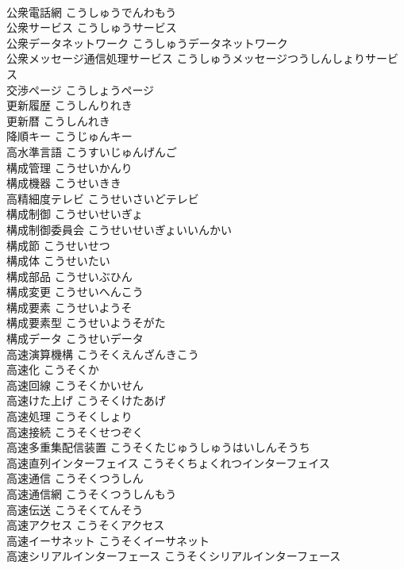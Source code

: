 \documentclass[8pt]{extreport}
\begin{document}
\begin{CJK}{UTF8}{min}
\\	公衆電話網	こうしゅうでんわもう	
\\	公衆サービス	こうしゅうサービス	
\\	公衆データネットワーク	こうしゅうデータネットワーク	
\\	公衆メッセージ通信処理サービス	こうしゅうメッセージつうしんしょりサービス	
\\	交渉ページ	こうしょうページ	
\\	更新履歴	こうしんりれき	
\\	更新暦	こうしんれき	
\\	降順キー	こうじゅんキー	
\\	高水準言語	こうすいじゅんげんご	
\\	構成管理	こうせいかんり	
\\	構成機器	こうせいきき	
\\	高精細度テレビ	こうせいさいどテレビ	
\\	構成制御	こうせいせいぎょ	
\\	構成制御委員会	こうせいせいぎょいいんかい	
\\	構成節	こうせいせつ	
\\	構成体	こうせいたい	
\\	構成部品	こうせいぶひん	
\\	構成変更	こうせいへんこう	
\\	構成要素	こうせいようそ	
\\	構成要素型	こうせいようそがた	
\\	構成データ	こうせいデータ	
\\	高速演算機構	こうそくえんざんきこう	
\\	高速化	こうそくか	
\\	高速回線	こうそくかいせん	
\\	高速けた上げ	こうそくけたあげ	
\\	高速処理	こうそくしょり	
\\	高速接続	こうそくせつぞく	
\\	高速多重集配信装置	こうそくたじゅうしゅうはいしんそうち	
\\	高速直列インターフェイス	こうそくちょくれつインターフェイス	
\\	高速通信	こうそくつうしん	
\\	高速通信網	こうそくつうしんもう	
\\	高速伝送	こうそくてんそう	
\\	高速アクセス	こうそくアクセス	
\\	高速イーサネット	こうそくイーサネット	
\\	高速シリアルインターフェース	こうそくシリアルインターフェース	

\end{CJK}
\end{document}
